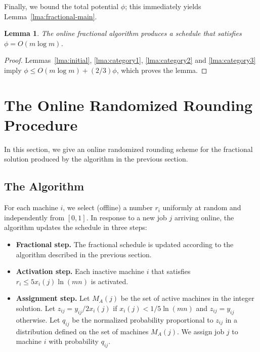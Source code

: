 \documentclass[11pt]{article}
\newtheorem{lemma}{Lemma}
\begin{document}
\noindent
Finally, we bound the total potential $\phi$; this immediately yields
Lemma~\ref{lma:fractional-main}.
\begin{lemma}
The online fractional algorithm produces a schedule that satisfies 
$\phi = O(m\log m)$.
\end{lemma}
\begin{proof}
Lemmas~\ref{lma:initial}, \ref{lma:category1}, 
\ref{lma:category2} and \ref{lma:category3} imply
$\phi \leq O(m\log m) + (2/3)\phi$,
which proves the lemma.
\end{proof}



























\section{The Online Randomized Rounding Procedure} 
\label{sec:rounding}

In this section, we give an online randomized rounding scheme for the fractional solution produced by
the algorithm in the previous section. 

\subsection{The Algorithm}
For each machine $i$, we select (offline) a number $r_i$ uniformly at random and 
independently from $[0, 1]$. In response to a new job $j$ arriving online, the
algorithm updates the schedule in three steps:
\begin{itemize}
\item {\bf Fractional step.} The fractional schedule is updated according to the algorithm 
described in the previous section.
\item {\bf Activation step.} Each inactive machine $i$ that satisfies $r_i \leq 5 x_i(j)\ln (mn)$
is activated.
\item {\bf Assignment step.} Let $M_A(j)$ be the set of active machines in the integer solution. Let 
$z_{ij} = y_{ij}/2 x_i(j)$ if $x_i(j) < 1/5\ln (mn)$ and $z_{ij} = y_{ij}$ otherwise. 
Let $q_{ij}$ be the normalized probability proportional to $z_{ij}$ in a distribution defined on the 
set of machines $M_A(j)$. We assign job $j$ to machine $i$ with probability $q_{ij}$.
\end{itemize}
\end{document}
